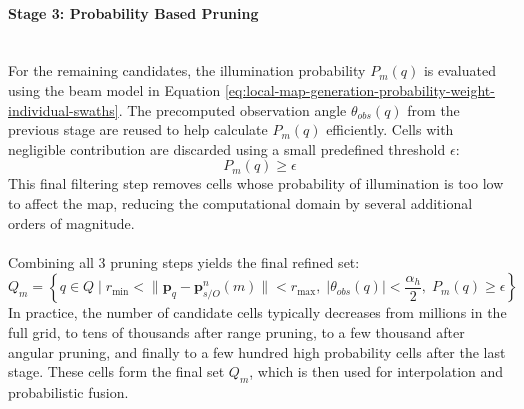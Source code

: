 \paragraph{Stage 3: Probability Based Pruning} \mbox{}\\[0.5em] \noindent
For the remaining candidates, the illumination probability $P_m(q)$ is evaluated using the beam model in Equation \ref{eq:local-map-generation-probability-weight-individual-swaths}. The precomputed observation angle $\theta_{obs}(q)$ from the previous stage are reused to help calculate $P_m(q)$ efficiently. Cells with negligible contribution are discarded using a small predefined threshold $\epsilon$:
$$
    P_m(q) \geq \epsilon
$$
This final filtering step removes cells whose probability of illumination is too low to affect the map, reducing the computational domain by several additional orders of magnitude.
\\ \\
Combining all 3 pruning steps yields the final refined set:
$$
    Q_m = \left\{
        q \in Q \; \bigg| \;
        r_{\min} < \| \mathbf{p}_q - \mathbf{p}_{s/O}^{n}(m) \| < r_{\max},
        \;
        |\theta_{obs}(q)| < \frac{\alpha_h}{2},
        \;
        P_m(q) \geq \epsilon
    \right\}
$$
In practice, the number of candidate cells typically decreases from millions in the full grid, to tens of thousands after range pruning, to a few thousand after angular pruning, and finally to a few hundred high probability cells after the last stage. These cells form the final set $Q_m$, which is then used for interpolation and probabilistic fusion.

\newpage

